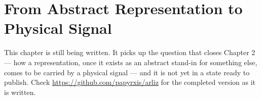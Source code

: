 \chapter{From Abstract Representation to Physical Signal}
\label{ch:representation-to-physical}

\begin{notebox}[title=A note on this chapter]
This chapter is still being written. It picks up the question that closes
Chapter 2 --- how a representation, once it exists as an abstract stand-in
for something else, comes to be carried by a physical signal --- and it is
not yet in a state ready to publish. Check
\url{https://github.com/papyrxis/arliz} for the completed version as it is
written.
\end{notebox}